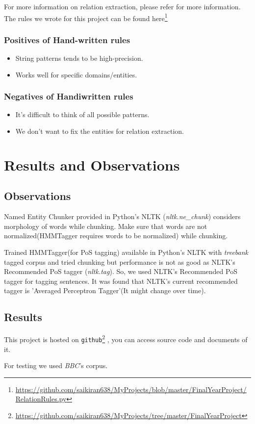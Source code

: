 \documentclass[12pt]{report}
\begin{document}
\par For more information on relation extraction, please refer \cite{BookIE} for more information.
The rules we wrote for this project can be found here\footnote{\url{https://github.com/saikiran638/MyProjects/blob/master/FinalYearProject/RelationRules.py}}
\subsection{Positives of Hand-written rules}
\begin{itemize}
\item String patterns tends to be  high-precision.
\item Works well for specific domains/entities.
\end{itemize}

\subsection{Negatives of Handiwritten rules}
\begin{itemize}
\item It's difficult to think of all possible patterns.
\item We don't want to fix the entities for relation extraction.
\end{itemize}

\chapter{Results and Observations}
\section{Observations}
\par Named Entity Chunker provided in Python's NLTK (\textit{nltk.ne\_chunk}) considers morphology of 
words while chunking. Make sure that words are not normalized(HMMTagger requires words to 
be normalized) while chunking.
\par Trained HMMTagger(for PoS tagging) available in Python's NLTK with \textit{treebank} tagged corpus and
 tried chunking but performance is not as good as NLTK's Recommended PoS tagger (\textit{nltk.tag}).
 So, we used NLTK's Recommended PoS tagger for tagging sentences. It was found that NLTK's
  current recommended tagger is 'Averaged Perceptron Tagger'(It might change over time).
 
\section{Results}
\par This project is hosted on \texttt{github}\footnote{\url{https://github.com/saikiran638/MyProjects/tree/master/FinalYearProject}}
, you can access source code and documents of it.
\par For testing we used \textit{BBC}'s corpus.
\end{document}
